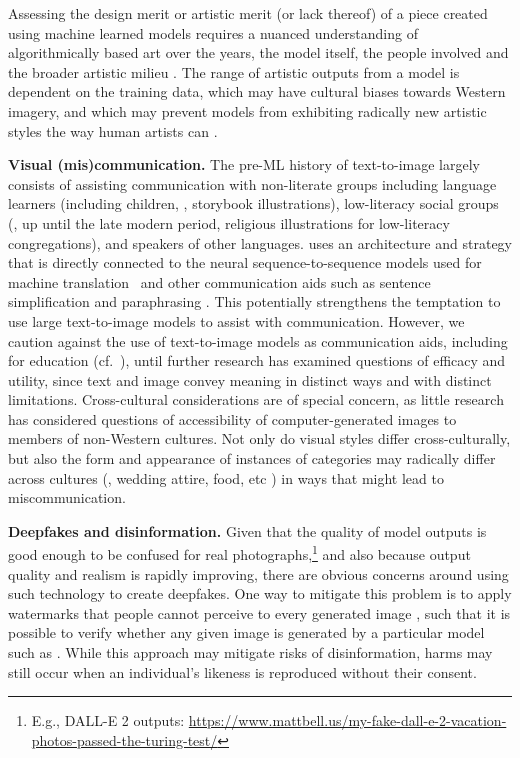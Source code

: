 Assessing the design merit or artistic merit (or lack thereof) of a piece created using machine learned models requires a nuanced understanding of algorithmically based art over the years, the model itself, the people involved and the broader artistic milieu \cite{browne_ai_artist}. The range of artistic outputs from a model is dependent on the training data, which may have cultural biases towards Western imagery, and which may prevent models from exhibiting radically new artistic styles the way human artists can \cite{gen-art-bias}.

\textbf{Visual (mis)communication.} The pre-ML history of text-to-image largely consists of assisting communication with non-literate groups including language learners (including children, \eg, storybook illustrations), low-literacy social groups (\eg, up until the late modern period, religious illustrations for low-literacy congregations), and speakers of other languages. \bdraw uses an architecture and strategy that is directly connected to the neural sequence-to-sequence models used for machine translation~\cite{wu2016google} and other communication aids such as sentence simplification \cite{alva-manchego-etal-2020-data} and paraphrasing \cite{zhou-bhat-2021-paraphrase}. This potentially strengthens the temptation to use large text-to-image models to assist with communication. However, we caution against the use of text-to-image models as communication aids, including for education (cf.~\cite{el2019tell}), until further research has examined questions of efficacy and utility, since text and image convey meaning in distinct ways and with distinct limitations. Cross-cultural considerations are of special concern, as little research has considered questions of accessibility of computer-generated images to members of non-Western cultures. Not only do visual styles differ cross-culturally, but also the form and appearance of instances of categories may radically differ across cultures (\eg, wedding attire, food, etc \cite{shankar2017no, de2019does}) in ways that might lead to miscommunication.

\textbf{Deepfakes and disinformation.} Given that the quality of model outputs is good enough to be confused for real photographs,\footnote{E.g., DALL-E 2 outputs: {\scriptsize \url{https://www.mattbell.us/my-fake-dall-e-2-vacation-photos-passed-the-turing-test/}}} and also because output quality and realism is rapidly improving, there are obvious concerns around using such technology to create deepfakes. One way to mitigate this problem is to apply watermarks that people cannot perceive to every generated image \cite{luo2020distortion}, such that it is possible to verify whether any given image is generated by a particular model such as \bdraw. While this approach may mitigate risks of disinformation, harms may still occur when an individual's likeness is reproduced without their consent.

